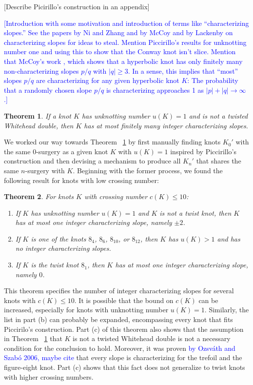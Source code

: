 \documentclass[11pt,usenames,dvipsnames,reqno]{amsart}
\newtheorem{theorem}{Theorem}
\numberwithin{theorem}{section}
\theoremstyle{ex}
\theoremstyle{rem}
\def\kh#1{\textcolor{Blue}{#1}}
\begin{document}
[Describe Picirillo’s construction in an appendix]


\kh{[Introduction with some motivation and introduction of terms like ``characterizing slopes.'' See the papers by Ni and Zhang and by McCoy and by Lackenby on characterizing slopes for ideas to steal. Mention Piccirillo's results for unknotting number one and using this to show that the Conway knot isn't slice. Mention that McCoy's work \cite{mccoy:hyperbolic}, which shows that a hyperbolic knot has only finitely many non-characterizing slopes $p/q$ with $|q| \geq 3$. In a sense, this implies that ``most'' slopes $p/q$ are characterizing for any given hyperbolic knot $K$: The  probability that a randomly chosen slope $p/q$ is characterizing approaches 1 as $|p|+|q|\to \infty$.]}

\begin{theorem}\label{thm:unknotting-one} If a knot $K$ has unknotting number $u(K)=1$ and is not a twisted Whitehead double, then $K$ has at most finitely many integer characterizing slopes.
\end{theorem}

We worked our way towards Theorem ~\ref{thm:unknotting-one} by first manually finding knots $K_{0}'$ with the same $0$-surgery as a given knot $K$ with $u(K)=1$ inspired by Piccirillo's construction and then devising a mechanism to produce all $K_n'$ that shares the same $n$-surgery with $K$. Beginning with the former process, we found the following result for knots with low crossing number:

\begin{theorem}\label{thm:low-crossing} For knots $K$ with crossing number $c(K) \leq 10$:
	\begin{enumerate}[label=\normalfont \bf (\alph*)]
		\item If $K$ has unknotting number $u(K)=1$ and $K$ is not a twist knot, then $K$ has at most one integer characterizing slope, namely $\pm 2$.
		\item If $K$ is one of the knots $8_4$, $8_6$, $8_{10}$, or $8_{12}$, then $K$ has $u(K)>1$ and has no integer characterizing slopes.
		\item If $K$ is the twist knot $8_1$, then $K$ has at most one integer characterizing slope, namely $0$.
	\end{enumerate}
\end{theorem}

This theorem specifies the number of integer characterizing slopes for several knots with $c(K) \leq 10$. It is possible that the bound on $c(K)$ can be increased, especially for knots with unknotting number $u(K) = 1$. Similarly, the list in part (b) can probably be expanded, encompassing every knot that fits Piccirilo's construction. Part (c) of this theorem also shows that the assumption in Theorem ~\ref{thm:unknotting-one} that $K$ is not a twisted Whitehead double is not a necessary condition for the conclusion to hold. Moreover, it was proven \kh{by Ozsv\'{a}th and Szab\'{o} 2006, maybe cite}  that every slope is characterizing for the trefoil and the figure-eight knot. Part (c) shows that this fact does not generalize to twist knots with higher crossing numbers.
\end{document}
